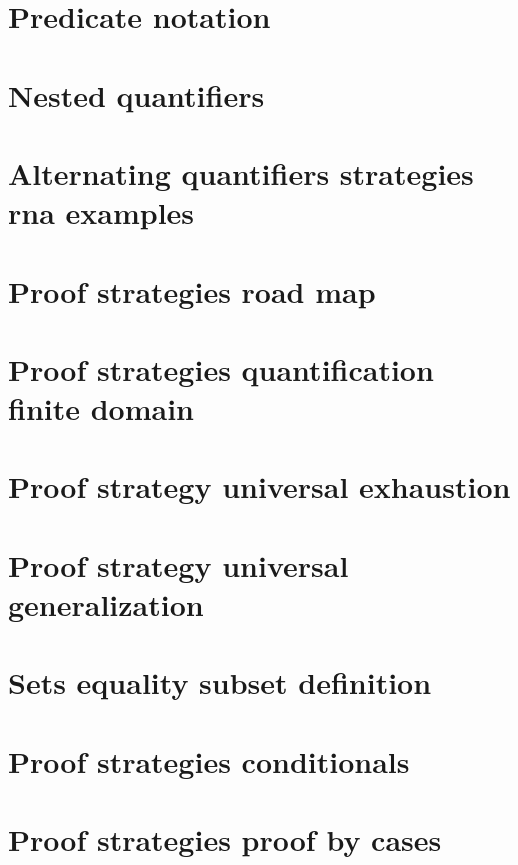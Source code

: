 \section*{Predicate notation}

\vfill
\section*{Nested quantifiers}

\vfill
\section*{Alternating quantifiers strategies rna examples}

\vfill
\section*{Proof strategies road map}

\vfill
\section*{Proof strategies quantification finite domain}

\vfill
\section*{Proof strategy universal exhaustion}

\vfill
\section*{Proof strategy universal generalization}

\vfill
\section*{Sets equality subset definition}

\vfill
\section*{Proof strategies conditionals}

\vfill
\section*{Proof strategies proof by cases}

\vfill
